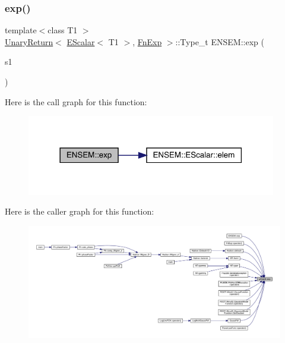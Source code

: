 \subsubsection{\texorpdfstring{exp()}{exp()}}
{\footnotesize\ttfamily template$<$class T1 $>$ \\
\mbox{\hyperlink{structENSEM_1_1UnaryReturn}{Unary\+Return}}$<$ \mbox{\hyperlink{classENSEM_1_1EScalar}{E\+Scalar}}$<$ T1 $>$, \mbox{\hyperlink{structENSEM_1_1FnExp}{Fn\+Exp}} $>$\+::Type\+\_\+t E\+N\+S\+E\+M\+::exp (\begin{DoxyParamCaption}\item[{const \mbox{\hyperlink{classENSEM_1_1EScalar}{E\+Scalar}}$<$ T1 $>$ \&}]{s1 }\end{DoxyParamCaption})\hspace{0.3cm}{\ttfamily [inline]}}

Here is the call graph for this function\+:
\nopagebreak
\begin{figure}[H]
\begin{center}
\leavevmode
\includegraphics[width=309pt]{d4/dca/group__escalar_ga80b6028648c4f7d8f84f04d129bfa976_cgraph}
\end{center}
\end{figure}
Here is the caller graph for this function\+:
\nopagebreak
\begin{figure}[H]
\begin{center}
\leavevmode
\includegraphics[width=350pt]{d4/dca/group__escalar_ga80b6028648c4f7d8f84f04d129bfa976_icgraph}
\end{center}
\end{figure}
\mbox{\label{group__escalar_ga60eef052054b1a7da3e16a844de7d565}} 
